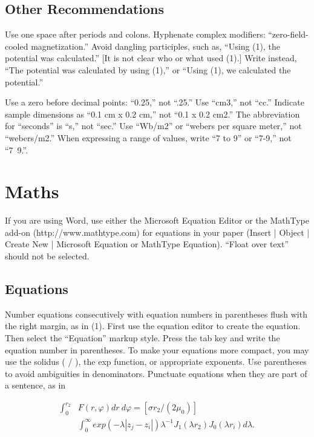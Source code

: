 \documentclass[journal]{IEEEtranTIE}
\begin{document}
\subsection{Other Recommendations}
Use one space after periods and colons. Hyphenate complex modifiers: ``zero-field-cooled magnetization.'' Avoid dangling participles, such as, ``Using (1), the potential was calculated.'' [It is not clear who or what used (1).] Write instead, ``The potential was calculated by using (1),'' or ``Using (1), we calculated the potential.''

Use a zero before decimal points: ``0.25,'' not ``.25.'' Use ``cm3,'' not ``cc.'' Indicate sample dimensions as ``0.1 cm x 0.2 cm,'' not ``0.1 x 0.2 cm2.'' The abbreviation for ``seconds'' is ``s,'' not ``sec.'' Use ``Wb/m2'' or ``webers per square meter,'' not ``webers/m2.'' When expressing a range of values, write ``7 to 9'' or ``7-9,'' not ``7~9.''.

\section{Maths}

If you are using Word, use either the Microsoft Equation Editor or the MathType add-on (http://www.mathtype.com) for equations in your paper (Insert | Object | Create New | Microsoft Equation or MathType Equation). ``Float over text'' should not be selected.

\subsection{Equations}
Number equations consecutively with equation numbers in parentheses flush with the right margin, as in (1). First use the equation editor to create the equation. Then select the ``Equation'' markup style. Press the tab key and write the equation number in parentheses. To make your equations more compact, you may use the solidus ( / ), the exp function, or appropriate exponents. Use parentheses to avoid ambiguities in denominators. Punctuate equations when they are part of a sentence, as in


\begin{align}
\nonumber\mathbf \int_{0}^{{r}_2} & F(r,\varphi) dr \ d\varphi = [\sigma{r}_2 / (2{\mu}_0)]
\\
& \int_{0}^{\infty} exp(-\lambda|{z}_j - {z}_i|){\lambda}^{-1} {J}_1 (\lambda {r}_2) {J}_0 (\lambda {r}_i) d \lambda .
\end{align}
\end{document}

